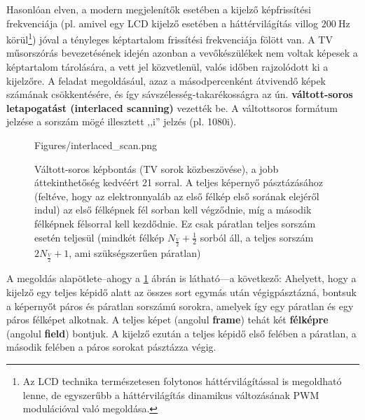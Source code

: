 Hasonlóan elven, a modern megjelenítők esetében a kijelző képfrissítési frekvenciája (pl. amivel egy LCD kijelző esetében a háttérvilágítás villog $200~\mathrm{Hz}$ körül\footnote{Az LCD technika természetesen folytonos háttérvilágítással is megoldható lenne, de egyszerűbb a háttérvilágítás dinamikus változásának PWM modulációval való megoldása.}) jóval a tényleges képtartalom frissítési frekvenciája fölött van.
A TV műsorszórás bevezetésének idején azonban a vevőkészülékek nem voltak képesek a képtartalom tárolására, a vett jel közvetlenül, valós időben rajzolódott ki a kijelzőre.
A feladat megoldásául, azaz a másodpercenként átvivendő képek számának csökkentésére, és így sávszélesség-takarékosságra az ún. \textbf{váltott-soros letapogatást (interlaced scanning)} vezették be.
A váltottsoros formátum jelzése a sorszám mögé illesztett ,,i'' jelzés (pl. 1080i).

\begin{figure}[]
	\centering
	\begin{overpic}[width = 0.85 \columnwidth ]{Figures/interlaced_scan.png}
	\end{overpic}
	\caption{Váltott-soros képbontás (TV sorok közbeszövése), a jobb áttekinthetőség kedvéért 21 sorral.
	A teljes képernyő pásztázásához (feltéve, hogy az elektronnyaláb az első félkép első sorának elejéről indul) az első félképnek fél sorban kell végződnie, míg a második félképnek félsorral kell kezdődnie.
	Ez csak páratlan teljes sorszám esetén teljesül (mindkét félkép $N_{\frac{V}{2}} + \frac{1}{2}$ sorból áll, a teljes sorszám $2 N_{\frac{V}{2}} + 1$, ami szükségszerűen páratlan) }
	\label{Fig:interlaced}
\end{figure}

A megoldás alapötlete--ahogy a \ref{Fig:interlaced} ábrán is látható---a következő:
Ahelyett, hogy a kijelző egy teljes képidő alatt az összes sort egymás után végigpásztázná, bontsuk a képernyőt páros és páratlan sorszámú sorokra, amelyek így egy páratlan és egy páros félképet alkotnak.
A teljes képet (angolul \textbf{frame}) tehát két \textbf{félképre} (angolul \textbf{field}) bontjuk.
A kijelző ezután a teljes képidő első felében a páratlan, a második felében a páros sorokat pásztázza végig.

